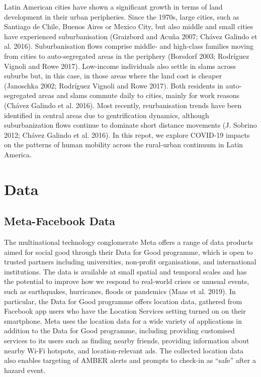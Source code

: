 \documentclass[
  10pt,
  letterpaper,
  DIV=11,
  numbers=noendperiod]{scrartcl}
\begin{document}
Latin American cities have shown a significant growth in terms of land
development in their urban peripheries. Since the 1970s, large cities,
such as Santiago de Chile, Buenos Aires or Mexico City, but also middle
and small cities have experienced suburbanisation (Graizbord and Acuña
2007; Chávez Galindo et al. 2016). Suburbanisation flows comprise
middle- and high-class families moving from cities to auto-segregated
areas in the periphery (Borsdorf 2003; Rodríguez Vignoli and Rowe 2017).
Low-income individuals also settle in slams across suburbs but, in this
case, in those areas where the land cost is cheaper (Janoschka 2002;
Rodríguez Vignoli and Rowe 2017). Both residents in auto-segregated
areas and slams commute daily to cities, mainly for work reasons (Chávez
Galindo et al. 2016). Most recently, reurbanisation trends have been
identified in central areas due to gentrification dynamics, although
suburbanization flows continue to dominate short distance movements (J.
Sobrino 2012; Chávez Galindo et al. 2016). In this repot, we explore
COVID-19 impacts on the patterns of human mobility across the
rural-urban continuum in Latin America.

\hypertarget{data}{%
\section{Data}\label{data}}

\hypertarget{meta-facebook-data}{%
\subsection{Meta-Facebook Data}\label{meta-facebook-data}}

The multinational technology conglomerate Meta offers a range of data
products aimed for social good through their Data for Good programme,
which is open to trusted partners including universities, non-profit
organisations, and international institutions. The data is available at
small spatial and temporal scales and has the potential to improve how
we respond to real-world crises or unusual events, such as earthquakes,
hurricanes, floods or pandemics (Maas et al. 2019). In particular, the
Data for Good programme offers location data, gathered from Facebook app
users who have the Location Services setting turned on on their
smartphone. Meta uses the location data for a wide variety of
applications in addition to the Data for Good programme, including
providing customised services to its users such as finding nearby
friends, providing information about nearby Wi-Fi hotspots, and
location-relevant ads. The collected location data also enables
targeting of AMBER alerts and prompts to check-in as ``safe'' after a
hazard event.
\end{document}
